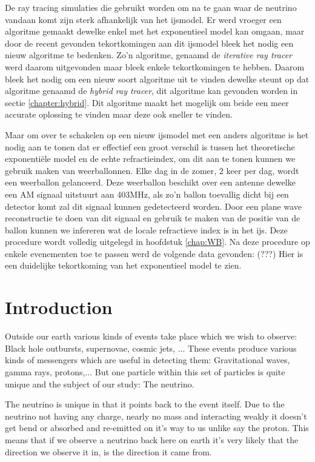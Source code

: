 \documentclass[11pt,a4paper,faculty=we,language=en,doctype=report]{cls/ugent-doc}
\begin{document}
De ray tracing simulaties die gebruikt worden om na te gaan waar de neutrino
vandaan komt zijn sterk afhankelijk van het ijsmodel.  Er werd vroeger een algoritme gemaakt dewelke enkel 
met het exponentieel model kan omgaan, maar door de recent gevonden tekortkomingen aan dit ijsmodel bleek 
het nodig een nieuw algoritme te bedenken. Zo'n algoritme, genaamd de \textit{iterative ray tracer} werd 
daarom uitgevonden maar bleek enkele tekortkomingen te hebben. Daarom bleek het nodig om een nieuw soort
algoritme uit te vinden dewelke steunt op dat algoritme genaamd de \textit{hybrid ray tracer}, dit algoritme
kan gevonden worden in sectie \ref{chapter:hybrid}. Dit algoritme maakt het mogelijk om beide een meer accurate
oplossing te vinden maar deze ook sneller te vinden.

Maar om over te schakelen op een nieuw ijsmodel met een anders algoritme is het nodig aan te tonen dat er effectief
een groot verschil is tussen het theoretische exponentiële model en de echte refractieindex, om dit aan te tonen 
kunnen we gebruik maken van weerballonnen. Elke dag in de zomer, 2 keer per dag, wordt een weerballon gelanceerd. 
Deze weerballon beschikt over een antenne dewelke een AM signaal uitstuurt aan 403MHz, als zo'n ballon toevallig
dicht bij een detector komt zal dit signaal kunnen gedetecteerd worden. Door een plane wave reconstructie te doen
van dit signaal en gebruik te maken van de positie van de ballon kunnen we infereren wat de locale refractieve index
is in het ijs. Deze procedure wordt volledig uitgelegd in hoofdstuk \ref{chap:WB}.
Na deze procedure op enkele evenementen toe te passen werd de volgende data gevonden:
(???)
Hier is een duidelijke tekortkoming van het exponentieel model te zien.
\newpage
\chapter*{Introduction}
Outside our earth various kinds of events take place which we wish to 
observe: Black hole outbursts, supernovae, cosmic jets, ...
These events produce various kinds of messengers which are useful in
detecting them: Gravitational waves, gamma rays, protons,...
But one particle within this set of particles is quite unique and
the subject of our study: The neutrino. 

The neutrino is unique in that it points back to the event itself.
Due to the neutrino not having any charge, nearly no mass and 
interacting weakly it doesn't get bend or absorbed and re-emitted 
on it's way to us unlike say the proton. This means that if we observe
a neutrino back here on earth it's very likely that the direction we observe
it in, is the direction it came from.
\end{document}

